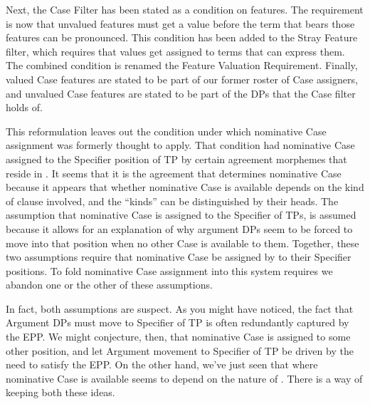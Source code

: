 Next, the Case Filter has been stated as a condition on features. The requirement is now that unvalued features must get a value before the term that bears those features can be pronounced. This condition has been added to the Stray Feature filter, which requires that values get assigned to terms that can express them. The combined condition is renamed the Feature Valuation Requirement. Finally, valued Case features are stated to be part of our former roster of Case assigners, and unvalued Case features are stated to be part of the DPs that the Case filter holds of.

This reformulation leaves out the condition under which nominative Case assignment was formerly thought to apply. That condition had nominative Case assigned to the Specifier position of TP by certain agreement morphemes that reside in . It seems that it is the agreement that determines nominative Case because it appears that whether nominative Case is available depends on the kind of clause involved, and the ``kinds'' can be distinguished by their heads. The assumption that nominative Case is assigned to the Specifier of TPs, is assumed because it allows for an explanation of why argument DPs seem to be forced to move into that position when no other Case is available to them. Together, these two assumptions require that nominative Case be assigned by  to their Specifier positions. To fold nominative Case assignment into this system requires we abandon one or the other of these assumptions.

In fact, both assumptions are suspect. As you might have noticed, the fact that Argument DPs must move to Specifier of TP is often redundantly captured by the EPP. We might conjecture, then, that nominative Case is assigned to some other position, and let Argument movement to Specifier of TP be driven by the need to satisfy the EPP. On the other hand, we've just seen that where nominative Case is available seems to depend on the nature of . There is a way of keeping both these ideas.

